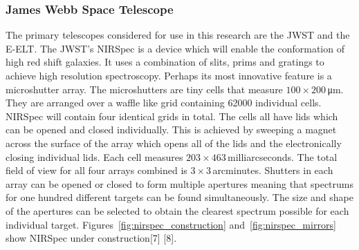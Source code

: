 		\subsubsection{James Webb Space Telescope} %
		\label{ssub:james_webb_space_telescope}
			The primary telescopes considered for use in this research are the JWST and the E-ELT. The JWST’s NIRSpec is a device which will enable the conformation of high red shift galaxies. It uses a combination of slits, prims and gratings to achieve high resolution spectroscopy. Perhaps its most innovative feature is a microshutter array. The microshutters are tiny cells that measure $100 \times 200$\,\si{\micro\metre}. They are arranged over a waffle like grid containing \num{62000} individual cells. NIRSpec will contain four identical grids in total. The cells all have lids which can be opened and closed individually. This is achieved by sweeping a magnet across the surface of the array which opens all of the lids and the electronically closing individual lids. Each cell measures $203 \times 463$\,milliarcseconds. The total field of view for all four arrays combined is $3 \times 3$\,arcminutes. Shutters in each array can be opened or closed to form multiple apertures meaning that spectrums for one hundred different targets can be found simultaneously. The size and shape of the apertures can be selected to obtain the clearest spectrum possible for each individual target. Figures~\ref{fig:nirspec_construction} and~\ref{fig:nirspec_mirrors} show NIRSpec under construction\cite{}[7] \cite{}[8].
